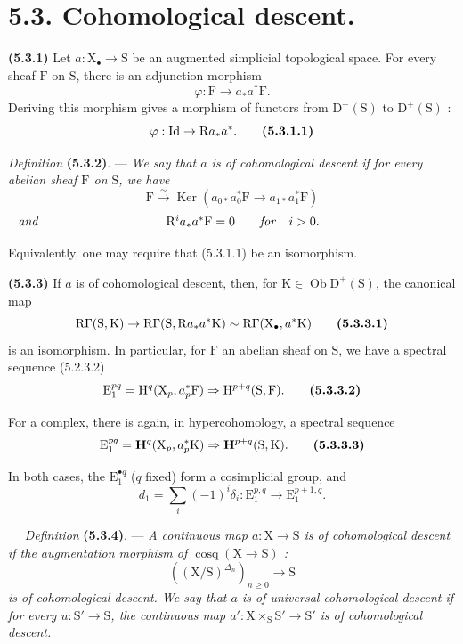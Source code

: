 \documentclass[11pt,leqno]{article}
\newcommand{\Page}[1]{\ifvmode\noindent\else\unskip\ \fi{\footnotesize\textcolor{gray}{[p.\,#1]}}\ \ignorespaces}
\begin{document}
\section*{5.3. Cohomological descent.}

\textbf{(5.3.1)} Let \(a:\mathrm{X}_{\bullet}\to\mathrm{S}\) be an augmented simplicial topological space. For every sheaf \(\mathrm{F}\) on \(\mathrm{S}\), there is an adjunction morphism
\[
\varphi:\mathrm{F}\to a_*a^*\mathrm{F}.
\]
Deriving this morphism gives a morphism of functors from \(\mathrm{D}^{+}(\mathrm{S})\) to \(\mathrm{D}^{+}(\mathrm{S})\) :
\[
\varphi:\mathrm{Id}\to\mathrm{R}a_*a^*.
\tag*{\textbf{(5.3.1.1)}}
\]

\textit{Definition} \textbf{(5.3.2)}. — \textit{We say that \(a\) is of \textup{cohomological descent} if for every abelian sheaf \(\mathrm{F}\) on \(\mathrm{S}\), we have}
\[
\mathrm{F}\xrightarrow{\sim}
\operatorname{Ker}(a_{0*}a_{0}^{*}\mathrm{F}\to a_{1*}a_{1}^{*}\mathrm{F})
\]
\[
\makebox[\linewidth]{\textit{and}\hfill
\(\mathrm{R}^{i}a_*a^*\mathrm{F}=0
\qquad\text{\textit{for}}\quad i>0.\)\hfill}
\]

Equivalently, one may require that (5.3.1.1) be an isomorphism.

\textbf{(5.3.3)} If \(a\) is of cohomological descent, then, for \(\mathrm{K}\in\operatorname{Ob}\mathrm{D}^{+}(\mathrm{S})\), the canonical map
\[
\mathrm{R}\Gamma(\mathrm{S},\mathrm{K})
\to\mathrm{R}\Gamma(\mathrm{S},\mathrm{R}a_*a^*\mathrm{K})
\sim\mathrm{R}\Gamma(\mathrm{X}_{\bullet},a^*\mathrm{K})
\tag*{\textbf{(5.3.3.1)}}
\]
is an isomorphism. In particular, for \(\mathrm{F}\) an abelian sheaf on \(\mathrm{S}\), we have a spectral sequence (5.2.3.2)
\[
\mathrm{E}_{1}^{pq}=\mathrm{H}^{q}(\mathrm{X}_{p},a_{p}^{*}\mathrm{F})
\Rightarrow\mathrm{H}^{p+q}(\mathrm{S},\mathrm{F}).
\tag*{\textbf{(5.3.3.2)}}
\]

For a complex, there is again, in hypercohomology, a spectral sequence
\[
\mathrm{E}_{1}^{pq}=\mathbf{H}^{q}(\mathrm{X}_{p},a_{p}^{*}\mathrm{K})
\Rightarrow\mathbf{H}^{p+q}(\mathrm{S},\mathrm{K}).
\tag*{\textbf{(5.3.3.3)}}
\]

In both cases, the \(\mathrm{E}_{1}^{\bullet q}\) (\(q\) fixed) form a cosimplicial group, and
\[
d_{1}=\sum_i(-1)^i\delta_i:
\mathrm{E}_{1}^{p,q}\to\mathrm{E}_{1}^{p+1,q}.
\]

\Page{15}
\textit{Definition} \textbf{(5.3.4)}. — \textit{A continuous map \(a:\mathrm{X}\to\mathrm{S}\) is of \textup{cohomological descent} if the augmentation morphism of \(\operatorname{cosq}(\mathrm{X}\to\mathrm{S})\) :}
\[
((\mathrm{X}/\mathrm{S})^{\Delta_n})_{n\geq 0}\to\mathrm{S}
\]
\textit{is of cohomological descent. We say that \(a\) is of \textup{universal cohomological descent} if for every \(u:\mathrm{S}'\to\mathrm{S}\), the continuous map \(a':\mathrm{X}\times_{\mathrm{S}}\mathrm{S}'\to\mathrm{S}'\) is of cohomological descent.}
\end{document}
